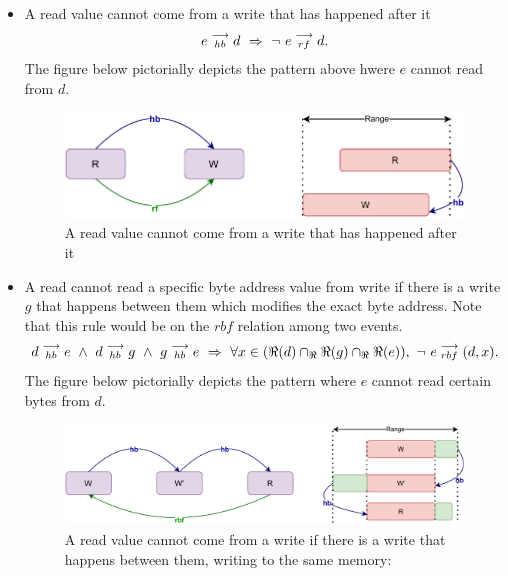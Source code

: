             \begin{itemize}
                \item A read value cannot come from a write that has happened after it 
                    \begin{align*}
                        \reln{e}{hb}{d}\ \Rightarrow{}\ \neg \ \reln{e}{rf}{d}.
                    \end{align*}
                    The figure below pictorially depicts the pattern above hwere $e$ cannot read from $d$.
                    \begin{figure}[H]
                        \centering
                        \includegraphics[scale=0.7]{ECMAScriptMemoryModel/CoherentReads1.pdf}
                        \caption{A read value cannot come from a write that has happened after it}
                    \end{figure}
                \item A read cannot read a specific byte address value from write if there is a write $g$ that happens between them which modifies the exact byte address. Note that this rule would be on the $rbf$ relation among two events. 
                    \begin{align*}
                        \reln{d}{hb}{e}
                        \ \wedge \ 
                        \reln{d}{hb}{g} \ \wedge \  \reln{g}{hb}{e}
                        \ \Rightarrow{} \
                        \forall x \in (\Re(d) \cap_\Re \Re(g) \cap_\Re \Re(e)), \ \neg \ \reln{e}{rbf}{(d,x)}.
                    \end{align*}
                    The figure below pictorially depicts the pattern where $e$ cannot read certain bytes from $d$. 
                    \begin{figure}[H]
                        \centering 
                        \includegraphics[scale=0.7]{ECMAScriptMemoryModel/CoherentReads2.pdf}
                        \caption{A read value cannot come from a write if
                        there is a write that happens between them, writing to the same memory:}
                    \end{figure}
                            
            \end{itemize}
         
